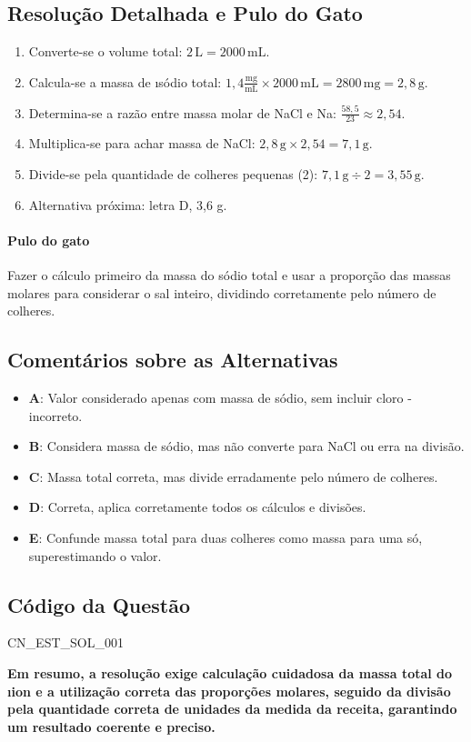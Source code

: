 \documentclass{article}
\begin{document}
\subsection*{Resolução Detalhada e Pulo do Gato}

\begin{enumerate}
  \item Converte-se o volume total: $2\,\mathrm{L} = 2000\,\mathrm{mL}$.
  \item Calcula-se a massa de \i{sódio} total: $1,4 \frac{\mathrm{mg}}{\mathrm{mL}} \times 2000\,\mathrm{mL} = 2800\,\mathrm{mg} = 2,8\,\mathrm{g}$.
  \item Determina-se a razão entre massa molar de NaCl e Na: $\frac{58,5}{23} \approx 2,54$.
  \item Multiplica-se para achar massa de NaCl: $2,8\,\mathrm{g} \times 2,54 = 7,1\,\mathrm{g}$.
  \item Divide-se pela quantidade de colheres pequenas (2): $7,1\,\mathrm{g} \div 2 = 3,55\,\mathrm{g}$.
  \item Alternativa próxima: letra D, 3,6 g.
\end{enumerate}

\paragraph{Pulo do gato} Fazer o cálculo primeiro da massa do sódio total e usar a proporção das massas molares para considerar o sal inteiro, dividindo corretamente pelo número de colheres.

\subsection*{Comentários sobre as Alternativas}

\begin{itemize}
  \item \textbf{A}: Valor considerado apenas com massa de sódio, sem incluir cloro - incorreto.
  \item \textbf{B}: Considera massa de sódio, mas não converte para NaCl ou erra na divisão.
  \item \textbf{C}: Massa total correta, mas divide erradamente pelo número de colheres.
  \item \textbf{D}: Correta, aplica corretamente todos os cálculos e divisões.
  \item \textbf{E}: Confunde massa total para duas colheres como massa para uma só, superestimando o valor.
\end{itemize}

\subsection*{Código da Questão}
CN_EST_SOL_001

\bigskip
\noindent\textbf{\large Em resumo, a resolução exige calculação cuidadosa da massa total do \i{ion} e a utilização correta das proporções molares, seguido da divisão pela quantidade correta de unidades da medida da receita, garantindo um resultado coerente e preciso.}
\end{document}
